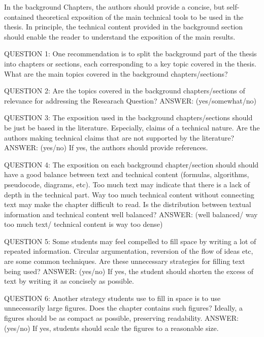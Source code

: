 
In the background Chapters, the authors should provide a concise, but self-contained theoretical exposition of the main technical tools to be used in the thesis. In principle, the technical content provided in the background section should enable the reader to understand the exposition of the main results.

QUESTION 1: One recommendation is to split the background part of the thesis into chapters or sections, each corresponding to a key topic covered in the thesis. What are the main topics covered in the background chapters/sections? 

QUESTION 2: Are the topics covered in the background chapters/sections of relevance for addressing the Researach Question?  
ANSWER: (yes/somewhat/no)

QUESTION 3: The exposition used in the background chapters/sections should be just be based in the literature. Especially, claims of a technical nature. Are the authors making technical claims that are not supported by the literature? 
ANSWER: (yes/no) If yes, the authors should provide references. 

QUESTION 4: The exposition on each background chapter/section should should have a good balance between text and technical content (formulas, algorithms, pseudocode, diagrams, etc). Too much text may indicate that there is a lack of depth in the technical part. Way too much technical content without connecting text may make the chapter difficult to read. Is the distribution between textual information and technical content well balanced? 
ANSWER: (well balanced/ way too much text/ technical content is way too dense) 

QUESTION 5: Some students may feel compelled to fill space by writing a lot of repeated information. Circular argumentation, reversion of the flow of ideas etc, are some common techniques. Are these unnecessary strategies for filling text being used? 
ANSWER: (yes/no) If yes, the student should shorten the excess of text by writing it as concisely as possible. 

QUESTION 6: Another strategy students use to fill in space is to use unnecessarily large figures. Does the chapter contains such figures? Ideally, a figures should be as compact as possible, preserving readability. 
ANSWER: (yes/no) If yes, students should scale the figures to a reasonable size. 


